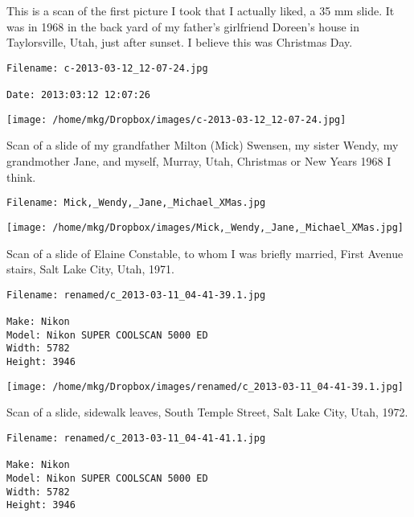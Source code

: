 

\noindent This is a scan of the first picture I took that I actually liked, a 35 mm slide. It was in 1968 in the back yard of my father's girlfriend Doreen's house in Taylorsville, Utah, just after sunset. I believe this was Christmas Day.
\begin{lstlisting}
Filename: c-2013-03-12_12-07-24.jpg

Date: 2013:03:12 12:07:26
\end{lstlisting}

\clearpage

\texttt{[image: /home/mkg/Dropbox/images/c-2013-03-12\_12-07-24.jpg]}
\clearpage


\noindent Scan of a slide of my grandfather Milton (Mick) Swensen, my sister Wendy, my grandmother Jane, and myself, Murray, Utah, Christmas or New Years 1968 I think.
\begin{lstlisting}
Filename: Mick,_Wendy,_Jane,_Michael_XMas.jpg

\end{lstlisting}

\clearpage

\texttt{[image: /home/mkg/Dropbox/images/Mick,\_Wendy,\_Jane,\_Michael\_XMas.jpg]}
\clearpage


\noindent Scan of a slide of Elaine Constable, to whom I was briefly married, First Avenue stairs, Salt Lake City, Utah, 1971.
\begin{lstlisting}
Filename: renamed/c_2013-03-11_04-41-39.1.jpg

Make: Nikon
Model: Nikon SUPER COOLSCAN 5000 ED
Width: 5782
Height: 3946
\end{lstlisting}

\begin{landscape}

\texttt{[image: /home/mkg/Dropbox/images/renamed/c\_2013-03-11\_04-41-39.1.jpg]}
\end{landscape}



\noindent Scan of a slide, sidewalk leaves, South Temple Street, Salt Lake City, Utah, 1972.
\begin{lstlisting}
Filename: renamed/c_2013-03-11_04-41-41.1.jpg

Make: Nikon
Model: Nikon SUPER COOLSCAN 5000 ED
Width: 5782
Height: 3946
\end{lstlisting}

